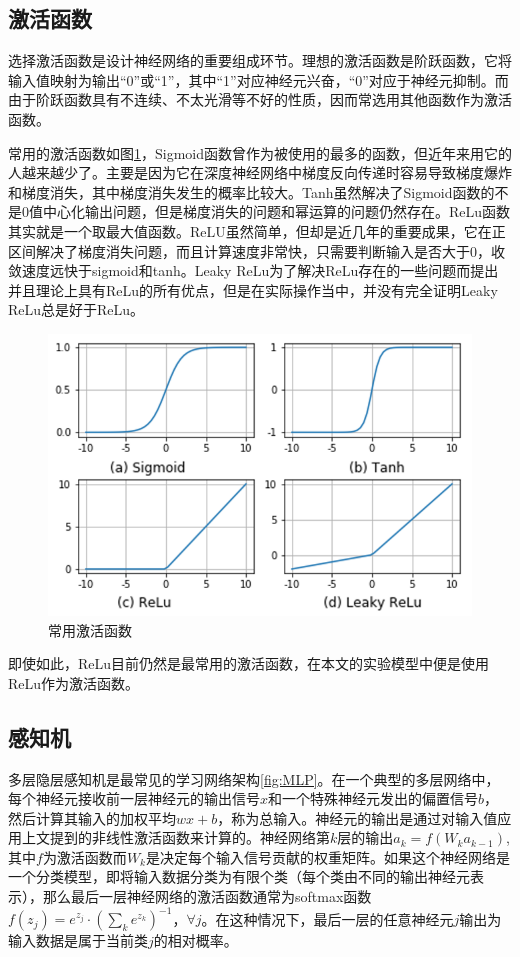 \documentclass[zihao = -4,cn]{oucart}
\begin{document}
\subsection{激活函数}
选择激活函数是设计神经网络的重要组成环节。理想的激活函数是阶跃函数，它将输入值映射为输出“0”或“1”，其中“1”对应神经元兴奋，“0”对应于神经元抑制。而由于阶跃函数具有不连续、不太光滑等不好的性质，因而常选用其他函数作为激活函数。\par
常用的激活函数如图\ref{fig:actfunc}，Sigmoid函数曾作为被使用的最多的函数，但近年来用它的人越来越少了。主要是因为它在深度神经网络中梯度反向传递时容易导致梯度爆炸和梯度消失，其中梯度消失发生的概率比较大。Tanh虽然解决了Sigmoid函数的不是0值中心化输出问题，但是梯度消失的问题和幂运算的问题仍然存在。ReLu函数其实就是一个取最大值函数。ReLU虽然简单，但却是近几年的重要成果，它在正区间解决了梯度消失问题，而且计算速度非常快，只需要判断输入是否大于0，收敛速度远快于sigmoid和tanh。Leaky ReLu为了解决ReLu存在的一些问题而提出并且理论上具有ReLu的所有优点，但是在实际操作当中，并没有完全证明Leaky ReLu总是好于ReLu。\par
\begin{figure}[h]
	\centering %
	\includegraphics[scale=0.6]{assets/actfunc}
	\caption{常用激活函数}
	\label{fig:actfunc}
\end{figure}
即使如此，ReLu目前仍然是最常用的激活函数，在本文的实验模型中便是使用ReLu作为激活函数。

\subsection{感知机}
多层隐层感知机是最常见的学习网络架构\ref{fig:MLP}。在一个典型的多层网络中，每个神经元接收前一层神经元的输出信号$x$和一个特殊神经元发出的偏置信号$b$，然后计算其输入的加权平均$wx+b$，称为总输入。神经元的输出是通过对输入值应用上文提到的非线性激活函数来计算的。神经网络第$k$层的输出$a_k = f(W_ka_{k-1})$,其中$f$为激活函数而$W_k$是决定每个输入信号贡献的权重矩阵。如果这个神经网络是一个分类模型，即将输入数据分类为有限个类（每个类由不同的输出神经元表示），那么最后一层神经网络的激活函数通常为softmax函数$f(z_j)=e^{z_j}\cdot(\sum_k{e^{z_k}})^{-1}$，$\forall{j}$。在这种情况下，最后一层的任意神经元$j$输出为输入数据是属于当前类$j$的相对概率。\par
\end{document}
